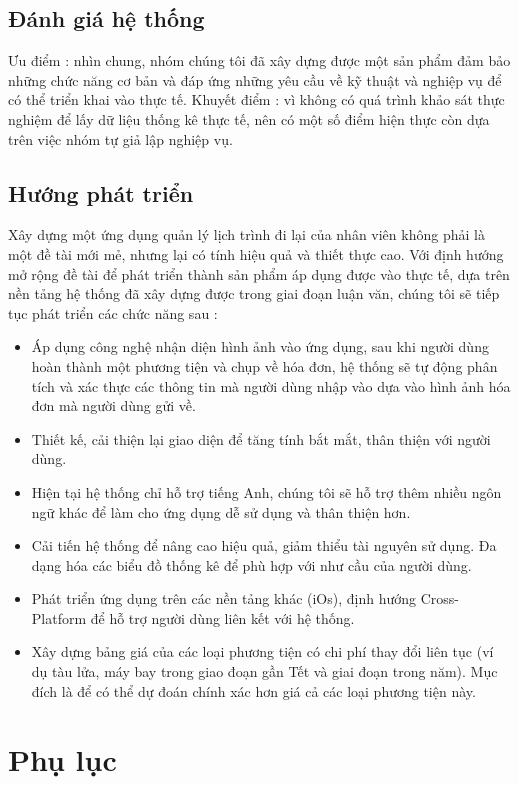 \documentclass{article}
\begin{document}
\subsection{Đánh giá hệ thống}
Ưu điểm : nhìn chung, nhóm chúng tôi đã xây dựng được một sản phẩm đảm bảo những chức năng cơ bản và đáp ứng những yêu cầu về kỹ thuật và nghiệp vụ để có thể triển khai vào thực tế. \newline
Khuyết điểm : vì không có quá trình khảo sát thực nghiệm để lấy dữ liệu thống kê thực tế, nên có một số điểm hiện thực còn dựa trên việc nhóm tự giả lập nghiệp vụ. 

\subsection{Hướng phát triển}
Xây dựng một ứng dụng quản lý lịch trình đi lại của nhân viên không phải là một đề tài mới mẻ, nhưng lại có tính hiệu quả và thiết thực cao. Với định hướng mở rộng đề tài để phát triển thành sản phẩm áp dụng được vào thực tế, dựa trên nền tảng hệ thống đã xây dựng được trong giai đoạn luận văn, chúng tôi sẽ tiếp tục phát triển các chức năng sau :
\begin{itemize}
    \item Áp dụng công nghệ nhận diện hình ảnh vào ứng dụng, sau khi người dùng hoàn thành một phương tiện và chụp về hóa đơn, hệ thống sẽ tự động phân tích và xác thực các thông tin mà người dùng nhập vào dựa vào hình ảnh hóa đơn mà người dùng gửi về.
    \item Thiết kế, cải thiện lại giao diện để tăng tính bắt mắt, thân thiện với người dùng.
    \item Hiện tại hệ thống chỉ hỗ trợ tiếng Anh, chúng tôi sẽ hỗ trợ thêm nhiều ngôn ngữ khác để làm cho ứng dụng dễ sử dụng và thân thiện hơn.
    \item Cải tiến hệ thống để nâng cao hiệu quả, giảm thiểu tài nguyên sử dụng. Đa dạng hóa các biểu đồ thống kê để phù hợp với như cầu của người dùng.
    \item Phát triển ứng dụng trên các nền tảng khác (iOs), định hướng Cross-Platform để hỗ trợ người dùng liên kết với hệ thống.
    \item Xây dựng bảng giá của các loại phương tiện có chi phí thay đổi liên tục (ví dụ tàu lửa, máy bay trong giao đoạn gần Tết và giai đoạn trong năm). Mục đích là để có thể dự đoán chính xác hơn giá cả các loại phương tiện này.
\end{itemize}

\section {Phụ lục}
\end{document}
